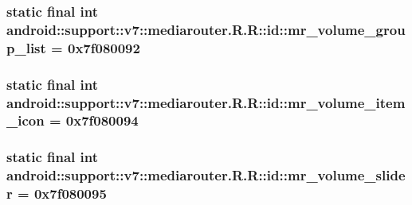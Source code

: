 \hypertarget{classandroid_1_1support_1_1v7_1_1mediarouter_1_1_r_1_1id_1593ea3a5e8f9b87219d85bca73fd337}{
\subsubsection[{mr\_\-volume\_\-group\_\-list}]{\setlength{\rightskip}{0pt plus 5cm}static final int android::support::v7::mediarouter.R.R::id::mr\_\-volume\_\-group\_\-list = 0x7f080092}}
\label{classandroid_1_1support_1_1v7_1_1mediarouter_1_1_r_1_1id_1593ea3a5e8f9b87219d85bca73fd337}


\hypertarget{classandroid_1_1support_1_1v7_1_1mediarouter_1_1_r_1_1id_4f0fd24c35f2b945c1693e49efbf3ac7}{
\subsubsection[{mr\_\-volume\_\-item\_\-icon}]{\setlength{\rightskip}{0pt plus 5cm}static final int android::support::v7::mediarouter.R.R::id::mr\_\-volume\_\-item\_\-icon = 0x7f080094}}
\label{classandroid_1_1support_1_1v7_1_1mediarouter_1_1_r_1_1id_4f0fd24c35f2b945c1693e49efbf3ac7}


\hypertarget{classandroid_1_1support_1_1v7_1_1mediarouter_1_1_r_1_1id_01bd7bd0312780ae4dacc898bfbe0cb6}{
\subsubsection[{mr\_\-volume\_\-slider}]{\setlength{\rightskip}{0pt plus 5cm}static final int android::support::v7::mediarouter.R.R::id::mr\_\-volume\_\-slider = 0x7f080095}}
\label{classandroid_1_1support_1_1v7_1_1mediarouter_1_1_r_1_1id_01bd7bd0312780ae4dacc898bfbe0cb6}


